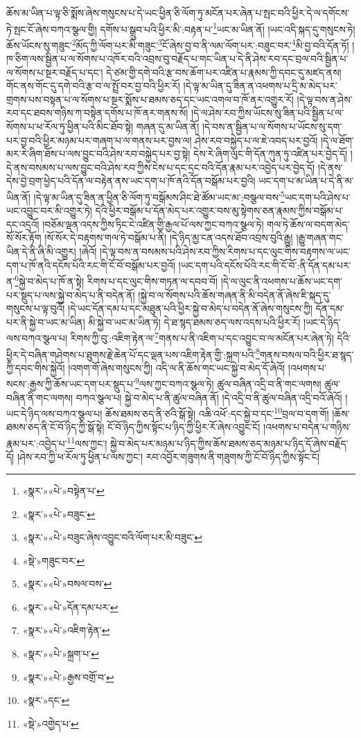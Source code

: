 ཆོས་མ་ཡིན་པ་ལྟ་ཅི་སྨོས་ཞེས་གསུངས་པ་དེ་ཡང་ཕྱིན་ཅི་ལོག་ཏུ་མངོན་པར་ཞེན་པ་སྤང་བའི་ཕྱིར་དེ་ལ་དགོངས་ཏེ་སྤང་ངོ་ཞེས་བཀའ་སྩལ་གྱི། དགོས་པ་སྒྲུབ་པའི་ཕྱིར་མི་:བརྟན་པ་\footnote{«སྣར་»«པེ་»བསྟེན་པ་}ཡང་མ་ཡིན་ནོ། །ཡང་འདི་སྐད་དུ་གསུངས་ཏེ། ཆོས་ཡོངས་སུ་གཟུང་\footnote{«སྣར་»«པེ་»བཟུང་}མོད་ཀྱི་ལོག་པར་མི་གཟུང་\footnote{«སྣར་»«པེ་»བཟུང་ཞེས་འབྱུང་བའི་ལོག་པར་མི་བཟུང་}ངོ་ཞེས་བྱ་བ་ནི་ལམ་ལོག་པར་:བཟུང་བར་\footnote{«སྡེ་»གཟུང་བར་}མི་བྱ་བའི་དོན་ཏོ། །ཁ་ཅིག་ལས་སྦྱིན་པ་ལ་སོགས་པ་འཁོར་བའི་འབྲས་བུ་བརྗོད་པ་གང་ཡིན་པ་དེ་ནི་ཤེས་རབ་དང་བྲལ་བའི་སྦྱིན་པ་ལ་སོགས་པ་སྔར་བརྗོད་པ་དང་། དེ་ཙམ་གྱི་དགེ་བའི་རྩ་བས་ཆོག་པར་འཛིན་པ་རྣམས་ཀྱི་དབང་དུ་མཛད་ནས། གོང་ནས་གོང་དུ་དགེ་བའི་རྩ་བ་ལ་སྤྲོ་བར་བྱ་བའི་ཕྱིར་རོ། །དེ་ལྟ་མ་ཡིན་དུ་ཟིན་ན་འཕགས་པ་དྲི་མ་མེད་པར་གྲགས་པས་བསྟན་པ་ལ་སོགས་པ་སྔར་སྨོས་པ་ཐམས་ཅད་དང་ཡང་འགལ་བ་ཁོ་ནར་འགྱུར་རོ། །དེ་ལྟ་བས་ན་ཤེས་རབ་དང་ཐབས་གཉིས་ཀ་བསྟེན་དགོས་པ་ཁོ་ནར་གནས་སོ། །དེ་ལ་ཤེས་རབ་ཀྱིས་ཡོངས་སུ་ཟིན་པའི་སྦྱིན་པ་ལ་སོགས་པ་ཕ་རོལ་ཏུ་ཕྱིན་པའི་མིང་ཐོབ་སྟེ། གཞན་དུ་མ་ཡིན་ནོ། །དེ་བས་ན་སྦྱིན་པ་ལ་སོགས་པ་ཡོངས་སུ་དག་པར་བྱ་བའི་ཕྱིར་མཉམ་པར་གཞག་པ་ལ་གནས་པར་བྱས་ལ། ཤེས་རབ་བསྐྱེད་པ་ལ་ཇེ་འབད་པར་བྱའོ། །དེ་ལ་ཐོག་མར་རེ་ཞིག་ཐོས་པ་ལས་བྱུང་བའི་ཤེས་རབ་བསྐྱེད་པར་བྱ་སྟེ། དེས་རེ་ཞིག་ལུང་གི་དོན་ཀུན་ཏུ་འཛིན་པར་བྱེད་དོ། །དེ་ནས་བསམས་པ་ལས་བྱུང་བའི་ཤེས་རབ་ཀྱིས་ངེས་པ་དང་དྲང་བའི་དོན་རྣམ་པར་འབྱེད་པར་བྱེད་དོ། །དེ་ནས་དེས་བྱེ་བྲག་ཕྱེད་པའི་དོན་ལ་བརྟེན་ནས་ཡང་དག་པ་ཁོ་ནའི་དོན་བསྒོམ་པར་བྱའི། ཡང་དག་པ་མ་ཡིན་པ་དེ་ནི་མ་ཡིན་ནོ། །དེ་ལྟ་མ་ཡིན་དུ་ཟིན་ན་ཕྱིན་ཅི་ལོག་ཏུ་བསྒོམས་ཤིང་ཐེ་ཚོམ་ཡང་མ་:བསྩལ་བས་\footnote{«སྣར་»«པེ་»བསལ་བས་}ཡང་དག་པའི་ཤེས་པ་ཡང་འབྱུང་བར་མི་འགྱུར་ཏེ། དེའི་ཕྱིར་བསྒོམ་པ་དོན་མེད་པར་འགྱུར་བས་མུ་སྟེགས་ཅན་རྣམས་ཀྱིས་བསྒོམ་པ་དང་འདྲའོ། །བཅོམ་ལྡན་འདས་ཀྱིས་ཏིང་ངེ་འཛིན་གྱི་རྒྱལ་པོ་ལས་ཀྱང་བཀའ་སྩལ་ཏེ། གལ་ཏེ་ཆོས་ལ་བདག་མེད་སོ་སོར་རྟོག །སོ་སོར་དེ་བརྟགས་གལ་ཏེ་བསྒོམ་པ་ནི། །དེ་ཉིད་མྱ་ངན་འདས་ཐོབ་འབྲས་བུའི་རྒྱུ། །རྒྱུ་གཞན་གང་ཡིན་དེ་ནི་ཞི་མི་འགྱུར། །ཞེའོ། །དེ་ལྟ་བས་ན་བསམས་པའི་ཤེས་རབ་ཀྱིས་རིགས་པ་དང་ལུང་གིས་བརྟགས་ལ་ཡང་དག་པ་ཁོ་ནའི་དངོས་པོའི་རང་གི་ངོ་བོ་བསྒོམ་པར་བྱའོ། །ཡང་དག་པའི་དངོས་པོའི་རང་གི་ངོ་བོ་:ནི་དོན་དམ་པར་ན་\footnote{«སྣར་»«པེ་»དོན་དམ་པར་}སྐྱེ་བ་མེད་པ་ཁོ་ན་སྟེ། རིགས་པ་དང་ལུང་གིས་གཏན་ལ་དབབ་བོ། །དེ་ལ་ལུང་ནི་འཕགས་པ་ཆོས་ཡང་དག་པར་སྡུད་པ་ལས་སྐྱེ་བ་མེད་པ་ནི་བདེན་ནོ། །སྐྱེ་བ་ལ་སོགས་པའི་ཆོས་གཞན་ནི་མི་བདེན་ནོ་ཞེས་ཇི་སྐད་དུ་གསུངས་པ་ལྟ་བུའོ། །དེ་ཡང་དོན་དམ་པ་དང་མཐུན་པའི་ཕྱིར་སྐྱེ་བ་མེད་པ་བདེན་ནོ་ཞེས་གསུངས་ཀྱི། དོན་དམ་པར་ནི་སྐྱེ་བ་ཡང་མ་ཡིན། མི་སྐྱེ་བ་ཡང་མ་ཡིན་ཏེ། དེ་ཐ་སྙད་ཐམས་ཅད་ལས་འདས་པའི་ཕྱིར་རོ། །ཡང་དེ་ཉིད་ལས་བཀའ་སྩལ་པ། རིགས་ཀྱི་བུ་:འཇིག་རྟེན་ལ་\footnote{«སྣར་»«པེ་»འཇིག་རྟེན་}གནས་པ་ནི་འཇིག་པ་དང་འབྱུང་བ་ལ་མངོན་པར་ཞེན་ཏེ། དེའི་ཕྱིར་དེ་བཞིན་གཤེགས་པ་ཐུགས་རྗེ་ཆེན་པོ་དང་ལྡན་པས་འཇིག་རྟེན་གྱི་:སྐྲག་པའི་\footnote{«སྣར་»«པེ་»སྐྲག་པ་}གནས་བསལ་བའི་ཕྱིར་ཐ་སྙད་ཀྱི་དབང་གིས་སྐྱེའོ། །འགག་གོ་ཞེས་གསུངས་ཀྱི། འདི་ལ་ནི་ཆོས་གང་ཡང་སྐྱེ་བ་མེད་དོ་ཞེའོ། །འཕགས་པ་སངས་:རྒྱས་ཀྱི་ཆོས་ཡང་དག་པར་སྡུད་པ་\footnote{«སྣར་»«པེ་»རྒྱས་བགྲོ་བ་}ལས་ཀྱང་བཀའ་སྩལ་ཏེ། ཚུལ་བཞིན་འདྲི་བ་ནི་གང་ལགས། ཚུལ་བཞིན་ནི་གང་ལགས། བཀའ་སྩལ་པ། སྐྱེ་བ་མེད་པ་ནི་ཚུལ་བཞིན་ནོ། །དེ་འདྲི་བ་ནི་ཚུལ་བཞིན་འདྲི་བའོ་ཞེའོ། །ཡང་དེ་ཉིད་ལས་བཀའ་སྩལ་པ། ཆོས་ཐམས་ཅད་ནི་ཙའི་སྒོ་སྟེ། འཆི་འཕོ་:དང་སྐྱེ་བ་དང་\footnote{«སྣར་»དང་}བྲལ་བ་དག་གོ། །ཆོས་ཐམས་ཅད་ནི་ངོ་བོ་ཉིད་ཀྱི་སྒོ་སྟེ། ངོ་བོ་ཉིད་ཀྱིས་སྟོང་པ་ཉིད་ཀྱི་ཕྱིར་རོ་ཞེས་འབྱུང་ངོ། །འཕགས་པ་བདེན་པ་གཉིས་རྣམ་པར་:འབྱེད་པ་\footnote{«སྡེ་»འགྱེད་པ་}ལས་ཀྱང་། སྐྱེ་བ་མེད་པར་མཉམ་པ་ཉིད་ཀྱིས་ཆོས་ཐམས་ཅད་མཉམ་པ་ཉིད་དོ་ཞེས་བརྗོད་དོ། །ཤེས་རབ་ཀྱི་ཕ་རོལ་ཏུ་ཕྱིན་པ་ལས་ཀྱང་། རབ་འབྱོར་གཟུགས་ནི་གཟུགས་ཀྱི་ངོ་བོ་ཉིད་ཀྱིས་སྟོང་ངོ། 